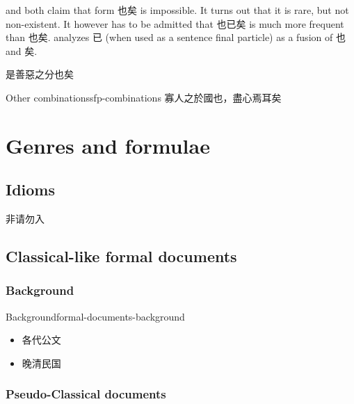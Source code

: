 \documentclass[UTF8, a4paper, oneside, scheme=plain, 12pt]{ctexrep}
\newcommand*{\citepage}[1]{p.~{#1}}
\begin{document}
\citet[\citepage{445}]{meiguang2018} and \citet[\citepage{19}]{pulleyblank1995outline} both claim that form 也矣 is impossible.
It turns out that it is rare, but not non-existent.
It however has to be admitted that 也已矣 is much more frequent than 也矣.
\citet[\citepage{20}]{pulleyblank1995outline} analyzes 已 (when used as a sentence final particle) as a fusion of 也 and 矣.

\begin{exe}
    \ex 是善惡之分也矣
\end{exe}

\begin{todobox}{Other combinations}{sfp-combinations}
    寡人之於國也，盡心焉耳矣
\end{todobox}

\chapter{Genres and formulae}\label{chap:formulae}

\section{Idioms}

\begin{exe}
    \ex 非请勿入
\end{exe}

\section{Classical-like formal documents}

\subsection{Background}

\begin{todobox}{Background}{formal-documents-background}
    \begin{itemize}
        \item 各代公文
        \item 晚清民国
    \end{itemize}
\end{todobox}

\subsection{Pseudo-Classical documents}\label{sec:genres.pseudo}
\end{document}

